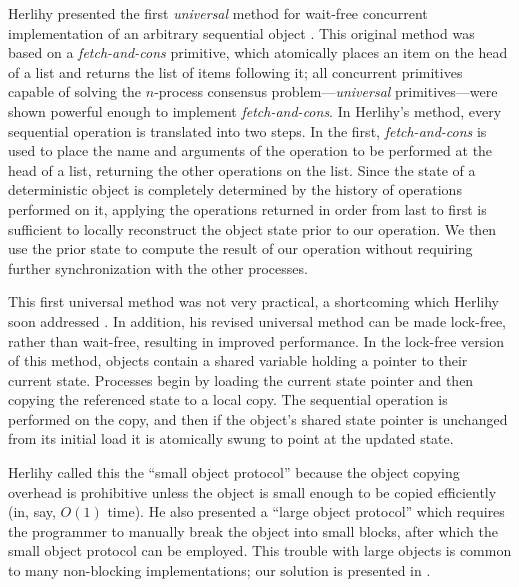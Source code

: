 \documentclass[preprint]{rdbacmconf}
\begin{document}
Herlihy presented the first \emph{universal} method for wait-free
concurrent implementation of an arbitrary sequential object
\cite{Herlihy88,Herlihy91}.  This original method was based on
a \emph{fetch-and-cons} primitive, which atomically places
an item on the head of a list and returns the list of items following
it; all concurrent primitives capable of solving the
$n$-process consensus problem---\emph{universal} primitives---were
shown powerful enough to implement \emph{fetch-and-cons}.
In Herlihy's method, 
every sequential operation is translated into two steps.  In the first,
\emph{fetch-and-cons} is used to place the name and arguments of the
operation to be performed
at the head of a list, returning the other operations on the list.
Since the state
of a deterministic object is completely determined by the history of
operations performed on it, applying the operations returned
in order from last to first is sufficient to locally reconstruct the
object state 
prior to our operation.
We then use the prior state to compute the result of our operation
without requiring further synchronization with the other processes.

This first universal method was not very practical, a shortcoming
which Herlihy soon addressed \cite{Herlihy93}.  In addition, his revised universal
method can be made lock-free, rather than wait-free, resulting in
improved performance.  In the lock-free version of this method,
objects contain a shared variable
holding a pointer to their current state.  Processes begin by loading
the current state pointer and then copying the referenced state to a
local copy.  The sequential operation is performed on the
copy, and then if the object's shared state pointer is unchanged from
its initial load it is atomically swung to point at the updated state.

Herlihy called this the ``small object protocol'' because the object
copying overhead is prohibitive unless the object is small enough to
be copied efficiently (in, say, $O(1)$ time).  He also presented a
``large object protocol'' which requires the programmer to
manually break the object into small blocks, after which the small
object protocol can be employed.  This trouble with large objects is
common to many non-blocking implementations; our solution is presented
in .
\end{document}
